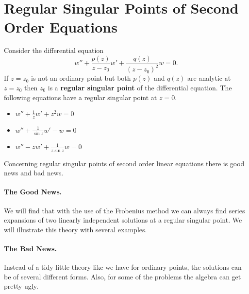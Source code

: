 \section{Regular Singular Points of Second Order Equations}
Consider the differential equation
\[ w'' + \frac{p(z)}{z-z_0} w' + \frac{q(z)}{(z-z_0)^2} w = 0.\]
If $z=z_0$ is not an ordinary point but both $p(z)$ and $q(z)$ are 
analytic at $z=z_0$ then $z_0$ is a \textbf{regular singular point} of the 
differential equation.  The following equations have a regular singular
point at $z=0$.
\begin{itemize}
\item $w'' + \frac{1}{z} w' + z^2 w = 0$
\item $w'' + \frac{1}{\sin z} w' - w = 0$
\item $w'' - z w' + \frac{1}{z \sin z} w = 0$
\end{itemize}

Concerning regular singular points of second order linear equations there
is good news and bad news.

\paragraph{The Good News.} We will find that with the use of the Frobenius 
method we can always find series expansions
of two linearly independent solutions at a regular singular point.  
We will illustrate this theory with several examples.

\paragraph{The Bad News.} Instead of a tidy little theory like we have for 
ordinary points, the solutions can be of several different forms.
Also, for some of the problems the algebra can get pretty ugly.




